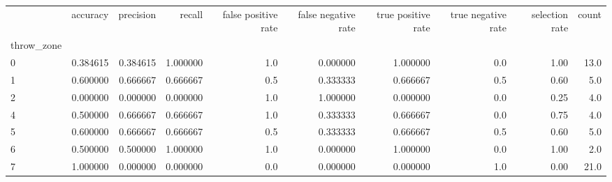 \begin{tabular}{lrrrrrrrrr}
\toprule
{} &  accuracy &  precision &    recall &  false positive rate &  false negative rate &  true positive rate &  true negative rate &  selection rate &  count \\
throw\_zone &           &            &           &                      &                      &                     &                     &                 &        \\
\midrule
0          &  0.384615 &   0.384615 &  1.000000 &                  1.0 &             0.000000 &            1.000000 &                 0.0 &            1.00 &   13.0 \\
1          &  0.600000 &   0.666667 &  0.666667 &                  0.5 &             0.333333 &            0.666667 &                 0.5 &            0.60 &    5.0 \\
2          &  0.000000 &   0.000000 &  0.000000 &                  1.0 &             1.000000 &            0.000000 &                 0.0 &            0.25 &    4.0 \\
4          &  0.500000 &   0.666667 &  0.666667 &                  1.0 &             0.333333 &            0.666667 &                 0.0 &            0.75 &    4.0 \\
5          &  0.600000 &   0.666667 &  0.666667 &                  0.5 &             0.333333 &            0.666667 &                 0.5 &            0.60 &    5.0 \\
6          &  0.500000 &   0.500000 &  1.000000 &                  1.0 &             0.000000 &            1.000000 &                 0.0 &            1.00 &    2.0 \\
7          &  1.000000 &   0.000000 &  0.000000 &                  0.0 &             0.000000 &            0.000000 &                 1.0 &            0.00 &   21.0 \\
\bottomrule
\end{tabular}
